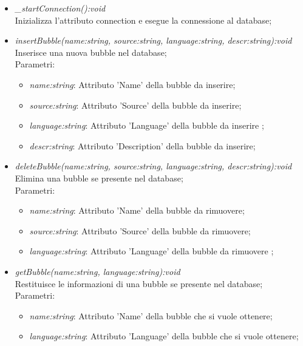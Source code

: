 \documentclass[../DefinizioneDiProdotto.tex]{subfiles}
\begin{document}
\begin{itemize}
\begin{itemize}
					\item \emph{\_startConnection():void} \\ 
					Inizializza l'attributo connection e esegue la connessione al database; \\
					
					\item \emph{insertBubble(name:string, source:string, language:string, descr:string):void} \\ 
					Inserisce una nuova bubble nel database; \\
					Parametri:
					\begin{itemize}
						\item \emph{name:string}: Attributo 'Name' della bubble da inserire;
						\item \emph{source:string}: Attributo 'Source' della bubble da inserire;
						\item \emph{language:string}: Attributo 'Language' della bubble da inserire ;
						\item \emph{descr:string}: Attributo 'Description' della bubble da inserire;
					\end{itemize}
					
					\item \emph{deleteBubble(name:string, source:string, language:string, descr:string):void} \\ 
					Elimina una bubble se presente nel database; \\
					Parametri:
					\begin{itemize}
						\item \emph{name:string}: Attributo 'Name' della bubble da rimuovere;
						\item \emph{source:string}: Attributo 'Source' della bubble da rimuovere;
						\item \emph{language:string}: Attributo 'Language' della bubble da rimuovere ;
					\end{itemize}
					
					\item \emph{getBubble(name:string, language:string):void} \\ 
					Restituisce le informazioni di una bubble se presente nel database; \\
					Parametri:
					\begin{itemize}
						\item \emph{name:string}: Attributo 'Name' della bubble che si vuole ottenere;
						\item \emph{language:string}: Attributo 'Language' della bubble che si vuole ottenere;
					\end{itemize}
					

\end{itemize}
\end{itemize}
\end{document}
